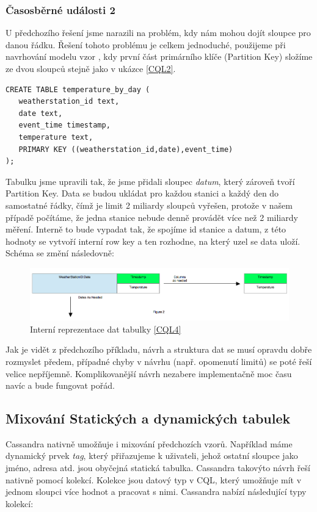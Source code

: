 \subsubsection*{Časosběrné události 2}
U předchozího řešení jsme narazili na problém, kdy nám mohou dojít sloupce pro danou řádku. Řešení tohoto problému je celkem jednoduché, použijeme při navrhování modelu vzor , kdy první část primárního klíče (Partition Key) složíme ze dvou sloupců stejně jako v ukázce \ref{CQL2}.


\begin{lstlisting}[caption={Dynamická tabulka 2},label=CQL4]
CREATE TABLE temperature_by_day (
   weatherstation_id text,
   date text,
   event_time timestamp,
   temperature text,
   PRIMARY KEY ((weatherstation_id,date),event_time)
);
\end{lstlisting}

Tabulku jsme upravili tak, že jsme přidali sloupec \emph{datum}, který zároveň tvoří Partition Key. Data se budou ukládat pro každou stanici a každý den do samostatné řádky, čímž je limit 2 miliardy sloupců vyřešen, protože v našem případě počítáme, že jedna stanice nebude denně provádět více než 2 miliardy měření. Interně to bude vypadat tak, že spojíme id stanice a datum, z této hodnoty se vytvoří interní row key a ten rozhodne, na který uzel se data uloží. Schéma se změní následovně: 

\begin{figure}[h]
\centering
\includegraphics[scale=0.4]{images/timeseries2}
\caption{Interní reprezentace dat tabulky \ref{CQL4}}
\label{fig:timeseries1}
\end{figure}

Jak je vidět z předchozího příkladu, návrh a struktura dat se musí opravdu dobře rozmyslet předem, případné chyby v návrhu (např. opomenutí limitů) se poté řeší velice nepříjemně. Komplikovanější návrh nezabere implementačně moc času navíc a bude fungovat pořád.


\subsection{Mixování Statických a dynamických tabulek}
Cassandra nativně umožňuje i mixování předchozích vzorů. Například máme dynamický prvek \emph{tag}, který přiřazujeme k uživateli, jehož ostatní sloupce jako jméno, adresa atd. jsou obyčejná statická tabulka. Cassandra takovýto návrh řeší nativně pomocí kolekcí. Kolekce jsou datový typ v CQL, který umožňuje mít v jednom sloupci více hodnot a pracovat s nimi. Cassandra nabízí následující typy kolekcí:


